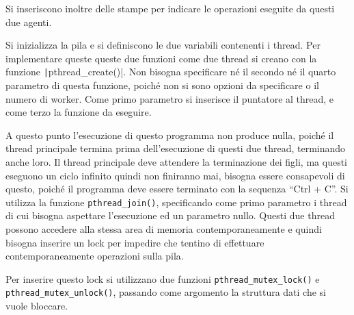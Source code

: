 \documentclass{article}
\numberwithin{equation}{subsection}
\begin{document}
Si inseriscono inoltre delle stampe per indicare le operazioni eseguite 
da questi due agenti. 

Si inizializza la pila e si definiscono le due variabili contenenti 
i thread. 
Per implementare queste queste due funzioni come due thread si creano 
con la funzione \texttt|pthread\_create()|. Non bisogna specificare né il 
secondo né il quarto parametro di questa funzione, poiché non si sono 
opzioni da specificare o il numero di worker. Come primo parametro si 
inserisce il puntatore al thread, e come terzo la funzione da eseguire. 

A questo punto l'esecuzione di questo programma non produce nulla, poiché il thread 
principale termina prima dell'esecuzione di questi due thread, terminando 
anche loro. 
Il thread principale deve attendere la terminazione dei figli, ma questi 
eseguono un ciclo infinito quindi non finiranno mai, bisogna essere 
consapevoli di questo, poiché il programma deve essere terminato con la 
sequenza ``Ctrl + C''. Si utilizza la funzione \verb|pthread_join()|, 
specificando come primo parametro i thread di cui bisogna aspettare l'esecuzione 
ed un parametro nullo. Questi due thread possono accedere alla stessa area di memoria 
contemporaneamente e quindi bisogna inserire un lock per impedire che 
tentino di effettuare contemporaneamente operazioni sulla pila. 

Per inserire questo lock si utilizzano due funzioni \verb|pthread_mutex_lock()| 
e \verb|pthread_mutex_unlock()|, passando come argomento la struttura dati 
che si vuole bloccare. 
\end{document}
